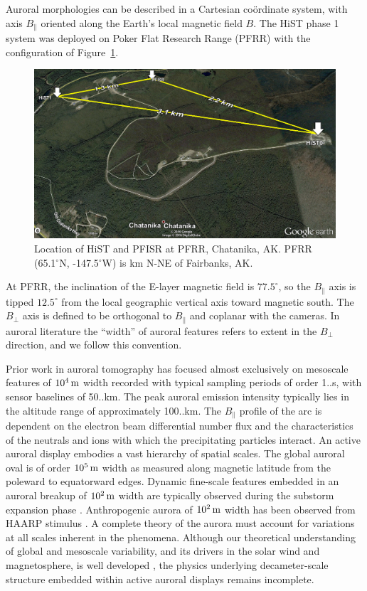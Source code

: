 Auroral morphologies can be described in a Cartesian coördinate system, with axis $B_\parallel$ oriented along the Earth's local magnetic field $B$.
The HiST phase 1 system was deployed on Poker Flat Research Range (PFRR) with the configuration of Figure~\ref{fig:histloc}.
\begin{figure}
	\includegraphics[width=\linewidth,trim=0 360 0 0,clip]{gfx/3sites}
	\caption{Location of HiST and PFISR at PFRR, Chatanika, AK. PFRR (65.1$^\circ$N, -147.5$^\circ$W) is \unit[30]{km} N-NE of Fairbanks, AK.}\label{fig:histloc}
\end{figure}
At PFRR, the inclination of the E-layer magnetic field is $77.5^\circ$, so the $B_\parallel$ axis is tipped $12.5^\circ$ from the local geographic vertical axis toward magnetic south.
The $B_\perp$ axis is defined to be orthogonal to $B_\parallel$ and coplanar with the cameras.
In auroral literature the ``width'' of auroral features refers to extent in the $B_\perp$ direction, and we follow this convention.

Prior work in auroral tomography \citep{jones1991,semeter1999,frey1998} has focused almost exclusively on mesoscale features of $\unit[10^4]{m}$ width recorded with typical sampling periods of order 1..\unit[30]{s}, with sensor baselines of 50..\unit[150]{km}.
The peak auroral emission intensity typically lies in the altitude range of approximately 100..\unit[300]{km}.
The $B_\parallel$ profile of the arc is dependent on the electron beam differential number flux and the characteristics of the neutrals and ions with which the precipitating particles interact.
An active auroral display embodies a vast hierarchy of spatial scales.
The global auroral oval is of order $\unit[10^5]{m}$ width as measured along magnetic latitude from the poleward to equatorward edges.
Dynamic fine-scale features embedded in an auroral breakup of $\unit[10^2]{m}$ width are typically observed during the substorm expansion phase \citep{semeter2008}.
Anthropogenic aurora of $\unit[10^2]{m}$ width has been observed from HAARP stimulus \citep{pederson2010,kendall2010}.
A complete theory of the aurora must account for variations at all scales inherent in the phenomena.
Although our theoretical understanding of global and mesoscale variability, and its drivers in the solar wind and magnetosphere, is well developed \citep{borovsky1993}, the physics underlying decameter-scale structure embedded within active auroral displays remains incomplete.

